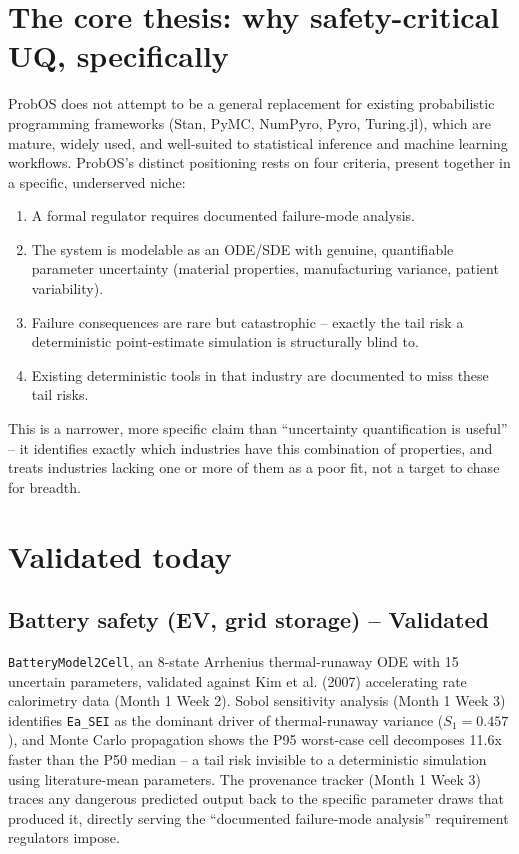 \documentclass[11pt]{article}
\begin{document}
\section*{The core thesis: why safety-critical UQ, specifically}
ProbOS does not attempt to be a general replacement for existing
probabilistic programming frameworks (Stan, PyMC, NumPyro, Pyro,
Turing.jl), which are mature, widely used, and well-suited to
statistical inference and machine learning workflows. ProbOS's
distinct positioning rests on four criteria, present together in a
specific, underserved niche:
\begin{enumerate}[leftmargin=*]
  \item A formal regulator requires documented failure-mode analysis.
  \item The system is modelable as an ODE/SDE with genuine,
    quantifiable parameter uncertainty (material properties,
    manufacturing variance, patient variability).
  \item Failure consequences are rare but catastrophic -- exactly the
    tail risk a deterministic point-estimate simulation is structurally
    blind to.
  \item Existing deterministic tools in that industry are documented
    to miss these tail risks.
\end{enumerate}
This is a narrower, more specific claim than ``uncertainty
quantification is useful'' -- it identifies exactly which industries
have this combination of properties, and treats industries lacking
one or more of them as a poor fit, not a target to chase for breadth.

\section*{Validated today}

\subsection*{Battery safety (EV, grid storage) -- Validated}
\texttt{BatteryModel2Cell}, an 8-state Arrhenius thermal-runaway ODE
with 15 uncertain parameters, validated against Kim et al. (2007)
accelerating rate calorimetry data (Month 1 Week 2). Sobol sensitivity
analysis (Month 1 Week 3) identifies \texttt{Ea\_SEI} as the dominant
driver of thermal-runaway variance ($S_1 = 0.457$), and Monte Carlo
propagation shows the P95 worst-case cell decomposes 11.6x faster than
the P50 median -- a tail risk invisible to a deterministic simulation
using literature-mean parameters. The provenance tracker (Month 1
Week 3) traces any dangerous predicted output back to the specific
parameter draws that produced it, directly serving the ``documented
failure-mode analysis'' requirement regulators impose.
\end{document}
